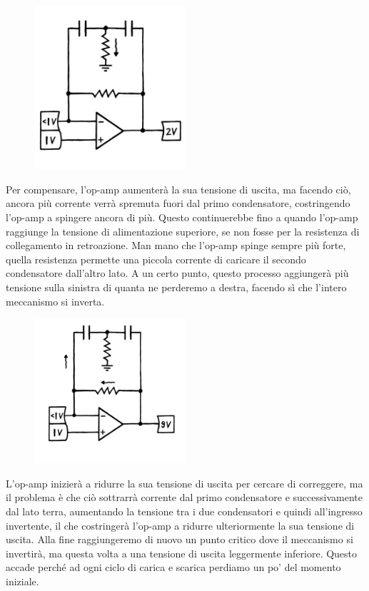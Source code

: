 \documentclass{article}
\theoremstyle{definition}
\begin{document}
\begin{figure}[ht]
    \centering
    \includegraphics[width=0.5\textwidth]{Toscillator2.png} 
    \label{fig:Toscillator2}
\end{figure}

Per compensare, l'op-amp aumenterà la sua tensione di uscita, ma facendo ciò, ancora più corrente verrà spremuta fuori dal primo condensatore, costringendo l'op-amp a spingere ancora di più.
Questo continuerebbe fino a quando l'op-amp raggiunge la tensione di alimentazione superiore, se non fosse per la resistenza di collegamento in retroazione.
Man mano che l'op-amp spinge sempre più forte, quella resistenza permette una piccola corrente di caricare il secondo condensatore dall'altro lato.
A un certo punto, questo processo aggiungerà più tensione sulla sinistra di quanta ne perderemo a destra, facendo sì che l'intero meccanismo si inverta.

\begin{figure}[ht]
    \centering
    \includegraphics[width=0.5\textwidth]{Toscillator3.png} 
    \label{fig:Toscillator3}
\end{figure}


L'op-amp inizierà a ridurre la sua tensione di uscita per cercare di correggere, ma il problema è che ciò sottrarrà corrente dal primo condensatore e successivamente dal lato terra, aumentando la tensione tra i due condensatori e quindi all'ingresso invertente, il che costringerà l'op-amp a ridurre ulteriormente la sua tensione di uscita.
Alla fine raggiungeremo di nuovo un punto critico dove il meccanismo si invertirà, ma questa volta a una tensione di uscita leggermente inferiore.
Questo accade perché ad ogni ciclo di carica e scarica perdiamo un po' del momento iniziale. 
\end{document}
